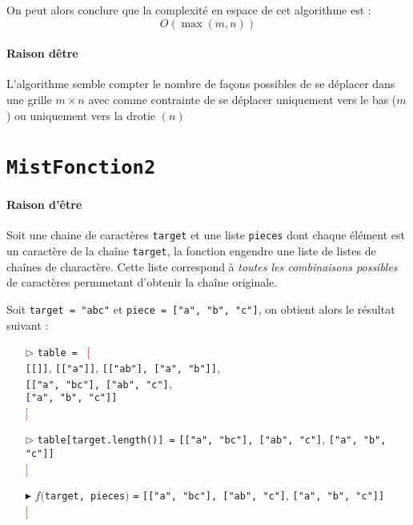 \documentclass[10pt]{report}
\begin{document}
  On peut alors conclure que la complexité
  en espace de cet algorithme est : 
  \[ O(\max(m, n)) \]


  \paragraph{Raison dêtre}
  L'algorithme semble compter le nombre de façons possibles de se déplacer 
  dans une grille $m \times n$ avec comme contrainte de se déplacer uniquement 
  vers le bas ($m$) ou uniquement vers la drotie $(n)$
  \section{\texttt{MistFonction2}} 
  \paragraph{Raison d'être}
  Soit une chaine de caractères \texttt{target} et une liste 
  \texttt{pieces} dont chaque élément est un caractère de  
  la chaîne \texttt{target}, la fonction engendre une 
  liste de listes de chaînes de charactère. Cette liste correspond 
  à \textit{toutes les combinaisons possibles} de caractères permmetant 
  d'obtenir la chaîne originale. 

  \begin{EExample}{}{}
    Soit \texttt{target = "abc"} et \texttt{piece = ["a", "b", "c"]}, on obtient 
    alors le résultat suivant : 
    \begin{itemize}
      \item [$\rhd$] \texttt{table = } \textcolor{red}{[}
        \\ \texttt{\textcolor{myb}{[}[]\textcolor{myb}{]}}, 
        \texttt{\textcolor{myb}{[}["a"]\textcolor{myb}{]}}, 
        \texttt{\textcolor{myb}{[}["ab"], ["a", "b"]\textcolor{myb}{]}}, \\
        \texttt{\textcolor{myb}{[}["a", "bc"], ["ab", "c"]}, \\ 
        \texttt{["a", "b", "c"]\textcolor{myb}{]}} \\
        \textcolor{red}{]}
      \item [$\rhd$] \texttt{table[target.length()] =}  
        \texttt{\textcolor{myb}{[}["a", "bc"], ["ab", "c"]},  
        \texttt{["a", "b", "c"]\textcolor{myb}{]}} \\
        \textcolor{red}{]}
      \item[$\blacktriangleright$] $f($\texttt{target, pieces}$)$ \texttt{=} 
        \texttt{\textcolor{myb}{[}["a", "bc"], ["ab", "c"]},  
        \texttt{["a", "b", "c"]\textcolor{myb}{]}} \\
        \textcolor{red}{]}


 
    \end{itemize}
     
  \end{EExample}
\end{document}
